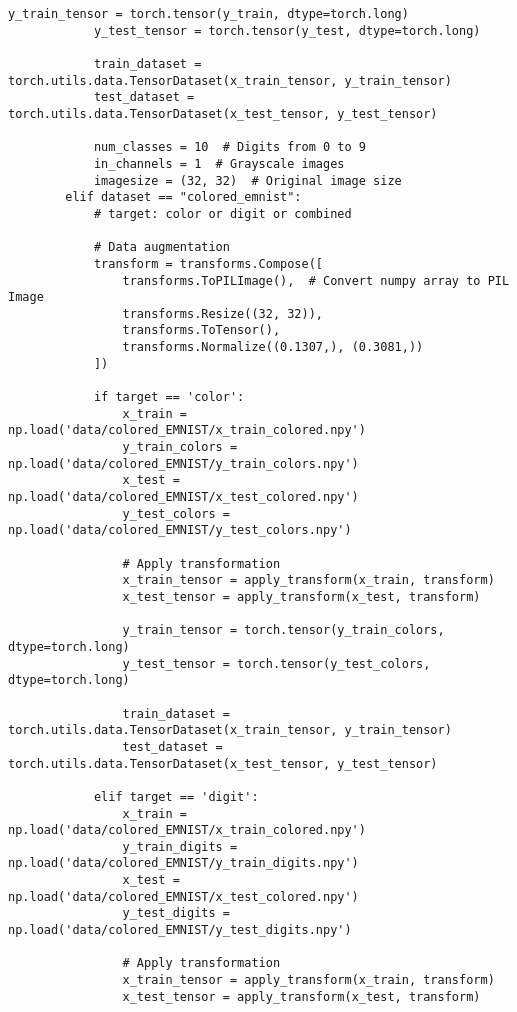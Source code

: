 \begin{lstlisting}[style=pythonstyle, caption={メインコード}]
            y_train_tensor = torch.tensor(y_train, dtype=torch.long)
            y_test_tensor = torch.tensor(y_test, dtype=torch.long)
    
            train_dataset = torch.utils.data.TensorDataset(x_train_tensor, y_train_tensor)
            test_dataset = torch.utils.data.TensorDataset(x_test_tensor, y_test_tensor)
    
            num_classes = 10  # Digits from 0 to 9
            in_channels = 1  # Grayscale images
            imagesize = (32, 32)  # Original image size
        elif dataset == "colored_emnist":
            # target: color or digit or combined
            
            # Data augmentation
            transform = transforms.Compose([
                transforms.ToPILImage(),  # Convert numpy array to PIL Image
                transforms.Resize((32, 32)),
                transforms.ToTensor(),
                transforms.Normalize((0.1307,), (0.3081,))
            ])
            
            if target == 'color':
                x_train = np.load('data/colored_EMNIST/x_train_colored.npy')
                y_train_colors = np.load('data/colored_EMNIST/y_train_colors.npy')
                x_test = np.load('data/colored_EMNIST/x_test_colored.npy')
                y_test_colors = np.load('data/colored_EMNIST/y_test_colors.npy')
                
                # Apply transformation
                x_train_tensor = apply_transform(x_train, transform)
                x_test_tensor = apply_transform(x_test, transform)
                
                y_train_tensor = torch.tensor(y_train_colors, dtype=torch.long)
                y_test_tensor = torch.tensor(y_test_colors, dtype=torch.long)
                
                train_dataset = torch.utils.data.TensorDataset(x_train_tensor, y_train_tensor)
                test_dataset = torch.utils.data.TensorDataset(x_test_tensor, y_test_tensor)
            
            elif target == 'digit':
                x_train = np.load('data/colored_EMNIST/x_train_colored.npy')
                y_train_digits = np.load('data/colored_EMNIST/y_train_digits.npy')
                x_test = np.load('data/colored_EMNIST/x_test_colored.npy')
                y_test_digits = np.load('data/colored_EMNIST/y_test_digits.npy')
                
                # Apply transformation
                x_train_tensor = apply_transform(x_train, transform)
                x_test_tensor = apply_transform(x_test, transform)
                

\end{lstlisting}
